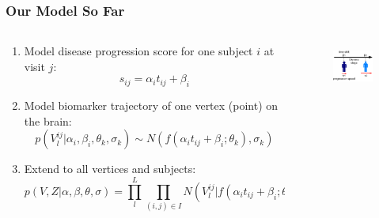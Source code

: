 \documentclass[8pt,xcolor=table]{beamer}
\begin{document}
\begin{frame}
\frametitle{Our Model So Far}

\begin{columns}[T]
    \begin{column}{.7\textwidth} %
   
     
   \begin{enumerate}      
      
      \item Model disease progression score for one subject $i$ at visit $j$:
      $$s_{ij} = \alpha_i t_{ij} + \beta_i$$
      
      \vspace{1em}
      
      \item Model biomarker trajectory of one vertex (point) on the brain:
      $$p(V_l^{ij} | \alpha_i, \beta_i, \theta_k, \sigma_k) \sim N(f(\alpha_i t_{ij} + \beta_i ; \theta_k), \sigma_k)$$
      
      \vspace{1em}
      
      \item Extend to all vertices and subjects:
  $$  p(V, Z | \alpha, \beta, \theta, \sigma) = \prod_l^L \prod_{(i,j) \in I} N(V_l^{ij} | f(\alpha_i t_{ij} + \beta_i ; \theta_{Z_l}), \sigma_{Z_l}) $$

      \vspace{1em}
  
     
     \end{enumerate}
     

    \end{column}
    \begin{column}{.3\textwidth}

    \vspace{-2em}
    
    \begin{figure}
    \centering
    \includegraphics[height=1.5cm]{disease_axis.png}
    \end{figure}
    

\end{column}
\end{columns}
\end{frame}
\end{document}
